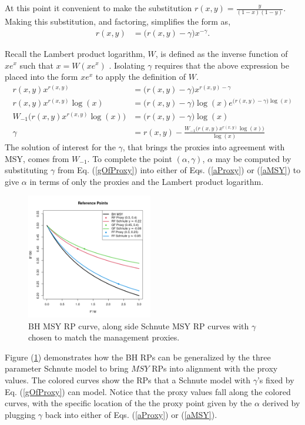 %
At this point it convenient to make the substitution $r(x,y)=\frac{y}{(1-x)(1-y)}$. Making this substitution, and factoring, simplifies the form as,
%
\begin{align}
r(x,y)&=\Big(r(x,y)-\gamma\Big)x^{-\gamma}.
\end{align}

%
Recall the Lambert product logarithm, $W$, is defined as the inverse function of $x e^x$ such that $x=W(xe^x)$ \cite{lehtonen_lambert_2016, corless_lambertw_1996}.
Isolating $\gamma$ requires that the above expression be placed into the form $xe^x$ to apply the definition of $W$. %
\begin{align}
r(x, y)x^{r(x, y)}&=\Big(r(x, y)-\gamma\Big)x^{r(x, y)-\gamma} \nonumber\\
r(x, y)x^{r(x, y)}\log(x) &= \Big(r(x, y)-\gamma\Big)\log(x) e^{\big(r(x, y)-\gamma\big)\log(x)} \nonumber\\
W_{-1}\Big(r(x, y)x^{r(x, y)}\log(x)\Big) &= \Big(r(x, y)-\gamma\Big)\log(x) \nonumber\\
\gamma &= r(x, y)-\frac{W_{-1}\Big(r(x, y)x^{r(x, y)}\log(x)\Big)}{\log(x)} \label{gOfProxy}
\end{align}
%
The solution of interest for the $\gamma$, that brings the proxies into agreement 
with MSY, comes from $W_{-1}$.
%
To complete the point $(\alpha, \gamma)$, $\alpha$ may be computed by 
substituting $\gamma$ from Eq. (\ref{gOfProxy}) into either of 
Eqs. (\ref{aProxy}) or (\ref{aMSY}) to give $\alpha$ in terms of only the proxies and the Lambert product logarithm. 

\begin{figure}
\includegraphics[width=0.49\textwidth]{../gpBias/rpProxAll0.2.png}
\caption{\label{rpProxCurves}BH MSY RP curve, along side Schnute MSY RP curves with $\gamma$ chosen to match the management proxies.}
\end{figure}
%
Figure (\ref{rpProxCurves}) demonstrates how the BH RPs can be generalized by 
the three parameter Schnute model to bring $MSY$ RPs into alignment with the 
proxy values. The colored curves show the RPs that a Schnute model with 
$\gamma$'s fixed by Eq. (\ref{gOfProxy}) can model. Notice that the proxy values 
fall along the colored curves, with the specific location of the the proxy point 
given by the $\alpha$ derived by plugging $\gamma$ back into either of Eqs. (\ref{aProxy}) 
or (\ref{aMSY}).

